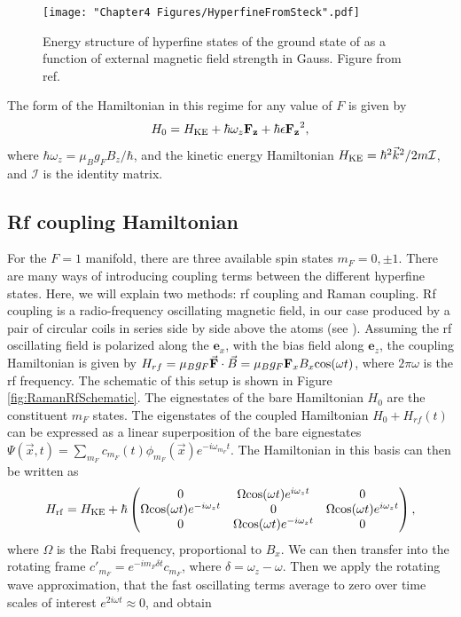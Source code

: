 \begin{figure}
	\texttt{[image: "Chapter4 Figures/HyperfineFromSteck".pdf]}
\caption{Energy structure of hyperfine states of the ground state of \Rb{} as a function of external magnetic field strength in Gauss.  Figure from ref. \cite{Steck}}
\label{fig:hyperfineSteck}
\end{figure}

The form of the Hamiltonian in this regime for any value of $F$ is given by
\begin{equation}
H_0 = H_{\rm KE} + \hbar \omega_z \mathbf{F_z} + \hbar\epsilon \mathbf{F_z}^2,
\end{equation}
where $\hbar \omega_z = \mu_B g_F B_z/\hbar$, and the kinetic energy Hamiltonian $H_{\rm KE} = \hbar^2 \vec{k}^2/2m \mathcal{I}$, and $\mathcal{I}$ is the identity matrix.

\subsection{Rf coupling Hamiltonian}

	For the $F=1$ manifold, there are three available spin states $m_F = 0,\pm1$. There are many ways of introducing coupling terms between the different hyperfine states. Here, we will explain two methods: rf coupling and Raman coupling. Rf coupling is a radio-frequency oscillating magnetic field, in our case produced by a pair of circular coils in series side by side above the atoms (see \cite{KarinaThesis}). Assuming the rf oscillating field is polarized along the $\mathbf{e}_x$, with the bias field along $\mathbf{e}_z$, the coupling Hamiltonian is given by $H_{rf} = \mu_B g_F \vec{\mathbf{F}}\cdot{}\vec{B} = \mu_B g_F \mathbf{F}_x B_x {\rm cos}(\omega t)$, where $2 \pi\omega$ is the rf frequency. The schematic of this setup is shown in Figure \ref{fig:RamanRfSchematic}.
	The eignestates of the bare Hamiltonian $H_0$ are the constituent $m_F$ states. The eigenstates of the coupled Hamiltonian $H_0 + H_{rf}(t)$ can be expressed as a linear superposition of the bare eignestates $\Psi(\vec{x},t)=\sum_{m_F}c_{m_F}(t)\phi_{m_F}(\vec{x})e^{-i\omega_{m_F}t}$. The Hamiltonian in this basis can then be written as\cite{LCT}
\begin{equation}
H_{\rm rf} = H_{\rm KE} + \hbar
 \begin{pmatrix} 0 & \Omega {\rm cos}(\omega t)e^{i\omega_zt}  & 0  \\ 
\Omega {\rm cos}(\omega t)e^{-i\omega_zt}  & 0 &  \Omega {\rm cos}(\omega t)e^{i\omega_zt} \\
 0 & \Omega {\rm cos}(\omega t)e^{-i\omega_zt}  & 0  \\
 \end{pmatrix} \\,
\end{equation}
where $\Omega$ is the Rabi frequency, proportional to $B_x$.
	 We can then transfer into the rotating frame $c'_{m_F} = e^{-i m_F \delta t}c_{m_F}$, where $\delta = \omega_z - \omega$. Then we apply the rotating wave approximation, that the fast oscillating terms average to zero over time scales of interest $e^{2i\omega t}\approx 0$, and obtain 

